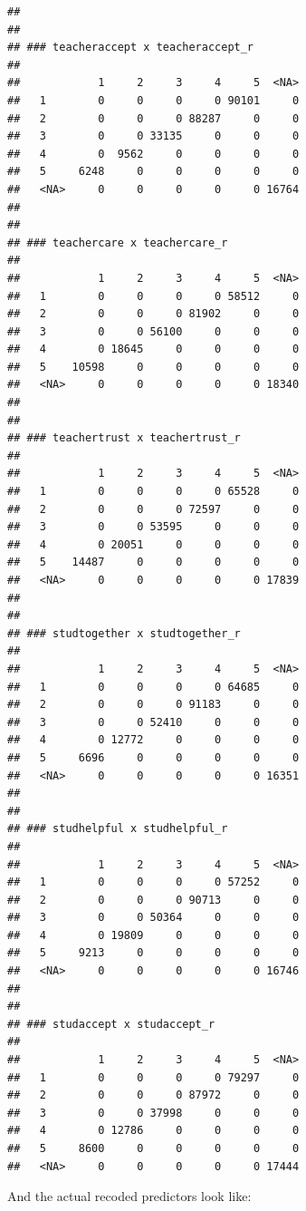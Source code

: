 \documentclass[
]{article}
\newenvironment{Shaded}{\begin{snugshade}}{\end{snugshade}}
\newcommand{\AttributeTok}[1]{\textcolor[rgb]{0.13,0.29,0.53}{#1}}
\newcommand{\DecValTok}[1]{\textcolor[rgb]{0.00,0.00,0.81}{#1}}
\newcommand{\FunctionTok}[1]{\textcolor[rgb]{0.13,0.29,0.53}{\textbf{#1}}}
\newcommand{\NormalTok}[1]{#1}
\newcommand{\OtherTok}[1]{\textcolor[rgb]{0.56,0.35,0.01}{#1}}
\newcommand{\SpecialCharTok}[1]{\textcolor[rgb]{0.81,0.36,0.00}{\textbf{#1}}}
\newcommand{\StringTok}[1]{\textcolor[rgb]{0.31,0.60,0.02}{#1}}
\begin{document}
\begin{verbatim}
## 
## 
## ### teacheraccept x teacheraccept_r 
##       
##            1     2     3     4     5  <NA>
##   1        0     0     0     0 90101     0
##   2        0     0     0 88287     0     0
##   3        0     0 33135     0     0     0
##   4        0  9562     0     0     0     0
##   5     6248     0     0     0     0     0
##   <NA>     0     0     0     0     0 16764
## 
## 
## ### teachercare x teachercare_r 
##       
##            1     2     3     4     5  <NA>
##   1        0     0     0     0 58512     0
##   2        0     0     0 81902     0     0
##   3        0     0 56100     0     0     0
##   4        0 18645     0     0     0     0
##   5    10598     0     0     0     0     0
##   <NA>     0     0     0     0     0 18340
## 
## 
## ### teachertrust x teachertrust_r 
##       
##            1     2     3     4     5  <NA>
##   1        0     0     0     0 65528     0
##   2        0     0     0 72597     0     0
##   3        0     0 53595     0     0     0
##   4        0 20051     0     0     0     0
##   5    14487     0     0     0     0     0
##   <NA>     0     0     0     0     0 17839
## 
## 
## ### studtogether x studtogether_r 
##       
##            1     2     3     4     5  <NA>
##   1        0     0     0     0 64685     0
##   2        0     0     0 91183     0     0
##   3        0     0 52410     0     0     0
##   4        0 12772     0     0     0     0
##   5     6696     0     0     0     0     0
##   <NA>     0     0     0     0     0 16351
## 
## 
## ### studhelpful x studhelpful_r 
##       
##            1     2     3     4     5  <NA>
##   1        0     0     0     0 57252     0
##   2        0     0     0 90713     0     0
##   3        0     0 50364     0     0     0
##   4        0 19809     0     0     0     0
##   5     9213     0     0     0     0     0
##   <NA>     0     0     0     0     0 16746
## 
## 
## ### studaccept x studaccept_r 
##       
##            1     2     3     4     5  <NA>
##   1        0     0     0     0 79297     0
##   2        0     0     0 87972     0     0
##   3        0     0 37998     0     0     0
##   4        0 12786     0     0     0     0
##   5     8600     0     0     0     0     0
##   <NA>     0     0     0     0     0 17444
\end{verbatim}

And the actual recoded predictors look like:

\begin{Shaded}
\end{Shaded}
\end{document}
